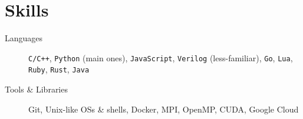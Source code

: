 \documentclass[12pt, a4paper]{article}
\begin{document}
\section{Skills}

\begin{description}
\item[Languages] \texttt{C/C++}, \texttt{Python} (main ones), \texttt{JavaScript}, \texttt{Verilog} (less-familiar), \texttt{Go}, \texttt{Lua}, \texttt{Ruby}, \texttt{Rust}, \texttt{Java}
\item[Tools \& Libraries] \textsf{Git}, \textsf{Unix}-like OSs \& shells, \textsf{Docker}, \textsf{MPI}, \textsf{OpenMP}, \textsf{CUDA}, Google Cloud
\end{description}
\end{document}
